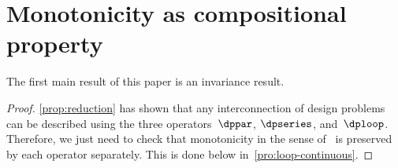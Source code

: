\section{Monotonicity as compositional property\label{sec:Monotone-Co-Design-Problems}}

The first main result of this paper is an invariance result.



\noindent
{}

\begin{proof}
\cref{prop:reduction} has shown that any interconnection of design
problems can be described using the three operators~$\dppar$, $\dpseries$,
and~$\dploop$. Therefore, we just need to check that monotonicity
in the sense of~ is preserved by each operator
separately. This is done below in~\textendash \ref{pro:loop-continuous}.
\end{proof}


